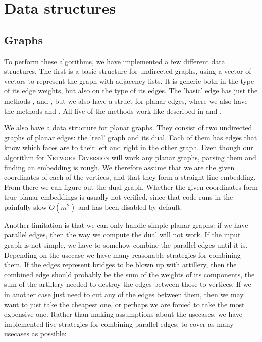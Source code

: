 
\section{Data structures}
\subsection{Graphs}
To perform these algorithms, we have implemented a few different data structures. The first is a basic structure for undirected graphs, using a vector of vectors to represent the graph with adjacency lists. It is generic both in the type of its edge weights, but also on the type of its edges.  The 'basic' edge has just the methods ,  and , but we also have a struct for planar edges, where we also have the methods  and . All five of the methods work like described in  and . 

We also have a data structure for planar graphs. They consist of two undirected graphs of planar edges: the 'real' graph and its dual. Each of them has edges that know which faces are to their left and right in the other graph. Even though our algorithm for \textsc{Network Diversion} will work any planar graphs, parsing them and finding an embedding is rough. We therefore assume that we are the given coordinates of each of the vertices, and that they form a straight-line embedding. From there we can figure out the dual graph. Whether the given coordinates form true planar embeddings is usually not verified, since that code runs in the painfully slow $O(m^2)$ and has been disabled by default.

Another limitation is that we can only handle simple planar graphs: if we have parallel edges, then the way we compute the dual will not work. If the input graph is not simple, we have to somehow combine the parallel edges until it is. Depending on the usecase we have many reasonable strategies for combining them. If the edges represent bridges to be blown up with artillery, then the combined edge should probably be the sum of the weights of its components, the sum of the artillery needed to destroy the edges between those to vertices. If we in another case just need to cut any of the edges between them, then we may want to just take the cheapest one, or perhaps we are forced to take the most expensive one. Rather than making assumptions about the usecases, we have implemented five strategies for combining parallel edges, to cover as many usecases as possible:

